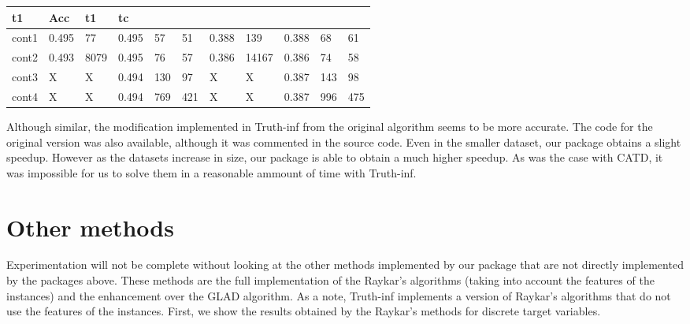 \documentclass[letterpaper,10pt,english]{sphinxmanual}
\begin{document}
\begin{savenotes}
\begin{tabulary}{\linewidth}[t]{|T|T|T|T|T|T|T|T|T|T|T|}
t1
&\sphinxstyletheadfamily 
Acc
&\sphinxstyletheadfamily 
t1
&\sphinxstyletheadfamily 
tc
\\
\hline
cont1
&
0.495
&
77
&
0.495
&
57
&
51
&
0.388
&
139
&
0.388
&
68
&
61
\\
\hline
cont2
&
0.493
&
8079
&
0.495
&
76
&
57
&
0.386
&
14167
&
0.386
&
74
&
58
\\
\hline
cont3
&
X
&
X
&
0.494
&
130
&
97
&
X
&
X
&
0.387
&
143
&
98
\\
\hline
cont4
&
X
&
X
&
0.494
&
769
&
421
&
X
&
X
&
0.387
&
996
&
475
\\
\hline
\end{tabulary}
\par
\sphinxattableend\end{savenotes}

Although similar, the modification implemented in Truth-inf from the original algorithm seems to be more
accurate. The code for the original version was also available, although it was commented in the source code.
Even in the smaller dataset, our package obtains a slight speedup. However as the datasets increase in size,
our package is able to obtain a much higher speedup. As was the case with CATD, it was impossible for us to
solve them in a reasonable ammount of time with Truth-inf.


\section{Other methods}
\label{\detokenize{package/other:other-methods}}
Experimentation will not be complete without looking at the other methods implemented by our package that
are not directly implemented by the packages above. These methods are the full implementation of the Raykar’s
algorithms (taking into account the features of the instances) and the enhancement over the GLAD algorithm. As a
note, Truth-inf implements a version of Raykar’s algorithms that do not use the features of the instances. First,
we show the results obtained by the Raykar’s methods for discrete target variables.
\end{document}
